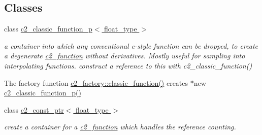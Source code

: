 \subsection*{Classes}
\begin{DoxyCompactItemize}
\item 
class \hyperlink{classc2__classic__function__p}{c2\+\_\+classic\+\_\+function\+\_\+p$<$ float\+\_\+type $>$}
\begin{DoxyCompactList}\small\item\em a container into which any conventional c-\/style function can be dropped, to create a degenerate \hyperlink{classc2__function}{c2\+\_\+function} without derivatives. Mostly useful for sampling into interpolating functions. construct a reference to this with c2\+\_\+classic\+\_\+function()

The factory function \hyperlink{classc2__factory_ae5c9140b2bfcc6416682562b99479974}{c2\+\_\+factory\+::classic\+\_\+function()} creates $\ast$new \hyperlink{classc2__classic__function__p_a8b2d09d67a8835902fd6c684d5b183b7}{c2\+\_\+classic\+\_\+function\+\_\+p()} \end{DoxyCompactList}\item 
class \hyperlink{classc2__const__ptr}{c2\+\_\+const\+\_\+ptr$<$ float\+\_\+type $>$}
\begin{DoxyCompactList}\small\item\em create a container for a \hyperlink{classc2__function}{c2\+\_\+function} which handles the reference counting.


\end{DoxyCompactList}
\end{DoxyCompactItemize}
